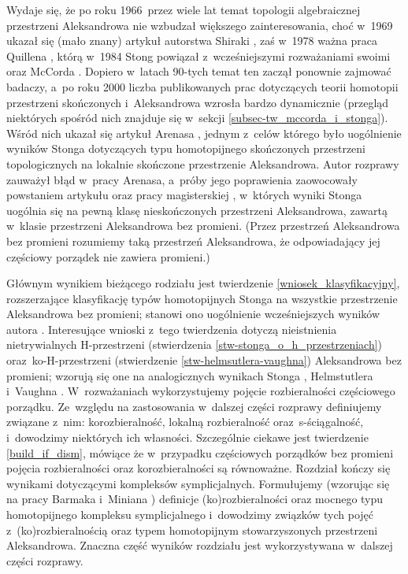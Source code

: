 Wydaje się, że po roku 1966~przez wiele lat temat topologii algebraicznej przestrzeni Aleksandrowa nie wzbudzał większego zainteresowania, choć w~1969 ukazał się (mało znany) artykuł autorstwa Shiraki \cite{Shiraki69}, zaś w~1978 ważna praca Quillena \cite{Quillen78}, którą w~1984 Stong \cite{Stong84} powiązał z~wcześniejszymi rozważaniami swoimi \cite{Stong66} oraz McCorda \cite{McCord66}.  Dopiero w~latach \mbox{90-tych} temat ten zaczął ponownie zajmować badaczy, a~po roku 2000 liczba publikowanych prac dotyczących teorii homotopii przestrzeni skończonych i~Aleksandrowa wzrosła bardzo dynamicznie (przegląd niektórych spośród nich znajduje się w~sekcji \ref{subsec-tw_mccorda_i_stonga}). Wśród nich ukazał się artykuł Arenasa \cite{Arenas99}, jednym z~celów którego było uogólnienie wyników Stonga dotyczących typu homotopijnego skończonych przestrzeni topologicznych na lokalnie skończone przestrzenie Aleksandrowa. Autor rozprawy zauważył błąd w~pracy Arenasa, a~próby jego poprawienia zaowocowały powstaniem artykułu \cite{Kukiela10a} oraz pracy magisterskiej \cite{Kukiela10}, w~których wyniki Stonga uogólnia się na pewną klasę nieskończonych przestrzeni Aleksandrowa, zawartą w~klasie przestrzeni Aleksandrowa bez promieni. (Przez przestrzeń Aleksandrowa bez promieni rozumiemy taką przestrzeń Aleksandrowa, że odpowiadający jej częściowy porządek nie zawiera promieni.)

Głównym wynikiem bieżącego rodziału jest twierdzenie \ref{wniosek_klasyfikacyjny}, rozszerzające klasyfikację typów homotopijnych Stonga \cite{Stong66} na wszystkie przestrzenie Aleksandrowa bez promieni; stanowi ono uogólnienie wcześniejszych wyników autora \cite{Kukiela10,Kukiela10a}. Interesujące wnioski z~tego twierdzenia dotyczą nieistnienia nietrywialnych H-przestrzeni (stwierdzenia \ref{stw-stonga_o_h_przestrzeniach}) oraz~ko-H-przestrzeni (stwierdzenie \ref{stw-helmsutlera-vaughna}) Aleksandrowa bez promieni; wzorują się one na analogicznych wynikach Stonga \cite{Stong66}, Helmstutlera i~Vaughna \cite{Helmstutler10}. W~rozważaniach wykorzystujemy pojęcie rozbieralności częściowego porządku. Ze~względu na zastosowania w~dalszej części rozprawy definiujemy związane z~nim: korozbieralność, lokalną rozbieralność oraz~s-ściągalność, i~dowodzimy niektórych ich własności. Szczególnie ciekawe jest twierdzenie \ref{build_if_dism}, mówiące że w~przypadku częściowych porządków bez promieni pojęcia rozbieralności oraz korozbieralności są równoważne. Rozdział kończy się wynikami dotyczącymi kompleksów symplicjalnych. Formułujemy (wzorując się na pracy Barmaka i~Miniana \cite{Barmak12}) definicje (ko)rozbieralności oraz mocnego typu homotopijnego kompleksu symplicjalnego i~dowodzimy związków tych pojęć z~(ko)rozbieralnością oraz typem homotopijnym stowarzyszonych przestrzeni Aleksandrowa. Znaczna część wyników rozdziału jest wykorzystywana w~dalszej części rozprawy.

